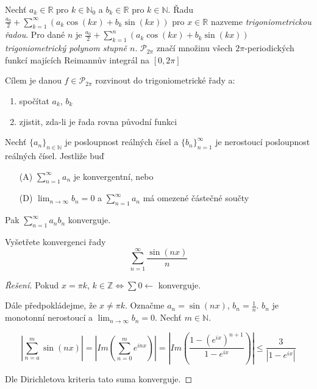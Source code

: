 \begin{definice}
Nechť $a_k \in \mathbb{R}$ pro $k \in \mathbb{N}_0$ a $b_k \in \mathbb{R}$ pro $k \in \mathbb{N}$. Řadu $\frac{a_0}{2} + \sum_{k=1}^{\infty} \left( a_k \cos (kx) + b_k \sin (kx) \right)$ pro $x \in \mathbb{R}$ nazveme \emph{trigoniometrickou řadou}. Pro dané $n$ je $\frac{a_0}{2} + \sum_{k=1}^{n} \left( a_k \cos (kx) + b_k \sin (kx) \right)$   \emph{trigoniometrický polynom stupně $n$}. $\mathcal{P}_{2 \pi}$ značí množinu všech $2 \pi$-periodických funkcí majících Reimannův integrál na $[0, 2 \pi]$
\end{definice}

Cílem je danou $f \in \mathcal{P}_{2 \pi}$ rozvinout do trigoniometrické řady a:
\begin{enumerate}
\item spočítat $a_k$, $b_k$
\item zjistit, zda-li je řada rovna původní funkci
\end{enumerate}

\begin{vetabd}
Nechť $\{ a_n \}_{n \in \mathbb{N}}$ je posloupnost reálných čísel a $\{ b_n \}_{n=1}^{\infty}$ je nerostoucí posloupnost reálných čísel. Jestliže buď
\begin{enumerate}
\item[(A)] $\sum_{n=1}^{\infty} a_n$ je konvergentní, nebo
\item[(D)] $\lim_{n \rightarrow \infty} b_n = 0$ a $\sum_{n=1}^{\infty} a_n$ má omezené částečné součty
\end{enumerate}
Pak $\sum_{n=1}^{\infty} a_n b_n$ konverguje.
\end{vetabd}

\begin{priklad}
Vyšetřete konvergenci řady
$$\sum_{n=1}^\infty \frac{\sin (nx)}{n}$$
\end{priklad}

\begin{proof}[Řešení]
Pokud $x= \pi k$, $k \in \mathbb{Z} \Leftrightarrow \sum 0 \leftarrow$ konverguje.

Dále předpokládejme, že $x \neq \pi k$. Označme $a_n = \sin (nx)$, $b_n = \frac{1}{n}$. $b_n$ je monotonní nerostoucí a $\lim_{n \rightarrow \infty} b_n = 0$. Nechť $m \in \mathbb{N}$.

$$\left | \sum_{n=a}^{m} \sin (nx) \right | = \left | Im \left( \sum_{n=0}^{m} e^{inx} \right ) \right | = \left | Im \left( \frac{1- \left( e^{ix} \right)^{n+1}  }{1-e^{ix}} \right) \right | \leq \frac{3}{ \left | 1-e^{ix} \right | }$$

Dle Dirichletova kriteria tato suma konverguje.

\end{proof}


